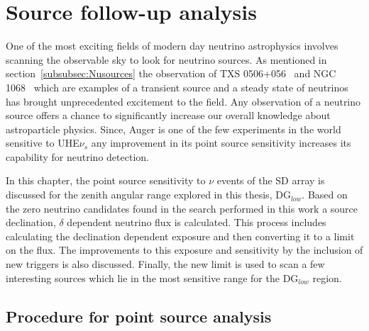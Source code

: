 
\chapter{Source follow-up analysis}
\label{chap:follow-up}

One of the most exciting fields of modern day neutrino astrophysics involves scanning the observable sky to look for neutrino sources. As mentioned in section~\ref{subsubsec:Nusources} the observation of TXS 0506+056~\cite{Icecube_txs} and NGC 1068~\cite{Icecube_2022} which are examples of a transient source and a steady state of neutrinos has brought unprecedented excitement to the field. Any observation of a neutrino source offers a chance to significantly increase our overall knowledge about astroparticle physics. Since, Auger is one of the few experiments in the world sensitive to UHE$\nu_s$ any improvement in its point source sensitivity increases its capability for neutrino detection. 

In this chapter, the point source sensitivity to $\nu$ events of the SD array is discussed for the zenith angular range explored in this thesis, DG$_{low}$. Based on the zero neutrino candidates found in the search performed in this work a source declination, $\delta$ dependent neutrino flux is calculated. This process includes calculating the declination dependent exposure and then converting it to a limit on the flux. The improvements to this exposure and sensitivity by the inclusion of new triggers is also discussed. Finally, the new limit is used to scan a few interesting sources which lie in the most sensitive range for the DG$_{low}$ region.

\section{Procedure for point source analysis}
\label{sec:procedure_point_source}

